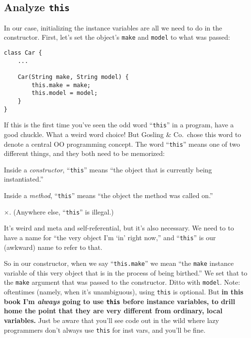 \subsection{Analyze \texttt{this}}

In our case, initializing the instance variables are all we need to do in the
constructor. First, let's set the object's \texttt{make} and \texttt{model} to
what was passed:

\begin{Verbatim}[samepage=true,fontsize=\footnotesize,frame=single]
class Car {
    ...

    Car(String make, String model) {
        this.make = make;
        this.model = model;
    }
}
\end{Verbatim}
\normalsize

If this is the first time you've seen the odd word ``\texttt{this}'' in a
program, have a good chuckle. What a weird word choice! But Gosling \&
Co.~chose this word to denote a central OO programming concept. The word
``\texttt{this}'' means one of two different things, and they both need to be
memorized:

\begin{samepage}
\begin{shaded}
\begin{compactenum}
\item Inside a \textit{constructor}, ``\texttt{this}'' means ``the object that is
currently being instantiated.''
\item Inside a \textit{method}, ``\texttt{this}'' means ``the object the
method was called on.''
\item[$\times$.] (Anywhere else, ``\texttt{this}'' is illegal.)
\normalsize
\end{compactenum}
\end{shaded}
\end{samepage}

It's weird and meta and self-referential, but it's also necessary. We need to
to have a name for ``the very object I'm `in' right now,'' and
``\texttt{this}'' is our (awkward) name to refer to that.

So in our constructor, when we say ``\texttt{this.make}'' we mean ``the
\texttt{make} instance variable of this very object that is in the process of
being birthed.'' We set that to the \texttt{make} argument that was passed to
the constructor. Ditto with \texttt{model}. Note: oftentimes (namely, when it's
unambiguous), using \texttt{this} is optional. But \textbf{in this book I'm
\textit{always} going to use \texttt{this} before instance variables, to drill
home the point that they are very different from ordinary, local variables.}
Just be aware that you'll see code out in the wild where lazy programmers don't
always use \texttt{this} for inst vars, and you'll be fine.

